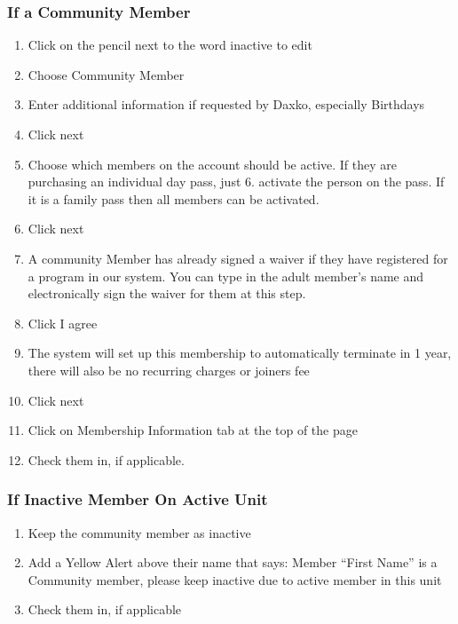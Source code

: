 \documentclass[
]{report}
\providecommand{\tightlist}{%
  \setlength{\itemsep}{0pt}\setlength{\parskip}{0pt}}\usepackage{longtable,booktabs,array}
\begin{document}
\hypertarget{if-a-community-member}{%
\subsubsection{If a Community Member}\label{if-a-community-member}}

\begin{enumerate}
\def\labelenumi{\arabic{enumi}.}
\setcounter{enumi}{5}
\tightlist
\item
  Click on the pencil next to the word inactive to edit
\item
  Choose Community Member
\item
  Enter additional information if requested by Daxko, especially
  Birthdays
\item
  Click next
\item
  Choose which members on the account should be active. If they are
  purchasing an individual day pass, just 6. activate the person on the
  pass. If it is a family pass then all members can be activated.
\item
  Click next
\item
  A community Member has already signed a waiver if they have registered
  for a program in our system. You can type in the adult member's name
  and electronically sign the waiver for them at this step.
\item
  Click I agree
\item
  The system will set up this membership to automatically terminate in 1
  year, there will also be no recurring charges or joiners fee
\item
  Click next
\item
  Click on Membership Information tab at the top of the page
\item
  Check them in, if applicable.
\end{enumerate}

\hypertarget{if-inactive-member-on-active-unit}{%
\subsubsection{If Inactive Member On Active
Unit}\label{if-inactive-member-on-active-unit}}

\begin{enumerate}
\def\labelenumi{\arabic{enumi}.}
\setcounter{enumi}{17}
\tightlist
\item
  Keep the community member as inactive
\item
  Add a Yellow Alert above their name that says: Member ``First Name''
  is a Community member, please keep inactive due to active member in
  this unit
\item
  Check them in, if applicable
\end{enumerate}
\end{document}
